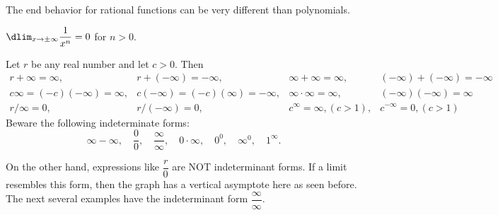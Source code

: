 \documentclass{book}
\begin{document}
The end behavior for rational functions can be very different than polynomials.

\begin{Prop} $\dlim_{x\to \pm\infty} \dfrac{1}{x^n} = 0$ for $n> 0$. \end{Prop}\vs


Let $r$ be any real number and let $c>0$. Then 
\[\begin{array}{cccc}
r+\infty = \infty, & r+(-\infty) = -\infty, & \infty + \infty = \infty, & (-\infty) + (-\infty) = -\infty\\
c\infty = (-c)(-\infty) = \infty, & c(-\infty) = (-c)(\infty) = -\infty, & \infty\cdot\infty =  \infty, & (-\infty)(-\infty) = \infty\\ 
r/\infty = 0, & r/(-\infty) = 0, & c^\infty = \infty, (c>1), & c^{-\infty} = 0, (c>1)
 \end{array}\] Beware the following indeterminate forms: \[\infty-\infty,\quad \dfrac{0}{0},\quad \dfrac{\infty}{\infty},\quad 0\cdot \infty,\quad 0^0,\quad \infty^0, \quad 1^\infty. \]
 
 On the other hand, expressions like $\dfrac{r}{0}$ are NOT indeterminant forms. If a limit resembles this form, then the graph has a vertical asymptote here as seen before.\\

The next several examples have the indeterminant form $\dfrac{\infty}{\infty}$.
\end{document}
